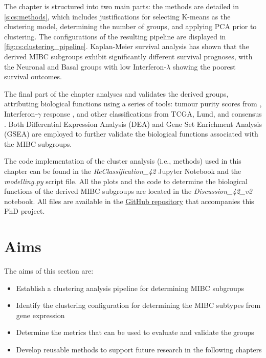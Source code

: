 The chapter is structured into two main parts: the methods are detailed in \cref{s:cs:methods}, which includes justifications for selecting K-means as the clustering model, determining the number of groups, and applying PCA prior to clustering. The configurations of the resulting pipeline are displayed in \cref{fig:cs:clustering_pipeline}. Kaplan-Meier survival analysis has shown that the derived MIBC subgroups exhibit significantly different survival prognoses, with the Neuronal and Basal groups with low Interferon-$\lambda$ showing the poorest survival outcomes.

The final part of the chapter analyses and validates the derived groups, attributing biological functions using a series of tools: tumour purity scores from \citet{Yoshihara2013-wq}, Interferon-$\gamma$ response \citet{Baker2022-bj}, and other classifications from TCGA, Lund, and consensus \citep{Robertson2017-mg,Marzouka2018-ge,Kamoun2020-tj}. Both Differential Expression Analysis (DEA) and Gene Set Enrichment Analysis (GSEA) are employed to further validate the biological functions associated with the MIBC subgroups.

The code implementation of the cluster analysis (i.e., methods) used in this chapter can be found in the \textit{ReClassification\_42} Jupyter Notebook and the \textit{modelling.py} script file. All the plots and the code to determine the biological functions of the derived MIBC subgroups are located in the \textit{Discussion\_42\_v2} notebook. All files are available in the \href{https://github.com/vladUng/Phd_thesis_exp}{GitHub repository} that accompanies this PhD project.


\section{Aims}

The aims of this section are:
\begin{itemize}
    \item Establish a clustering analysis pipeline for determining MIBC subgroups
    \item Identify the clustering configuration for determining the MIBC subtypes from gene expression
    \item Determine the metrics that can be used to evaluate and validate the groups
    \item Develop reusable methods to support future research in the following chapters
\end{itemize}



